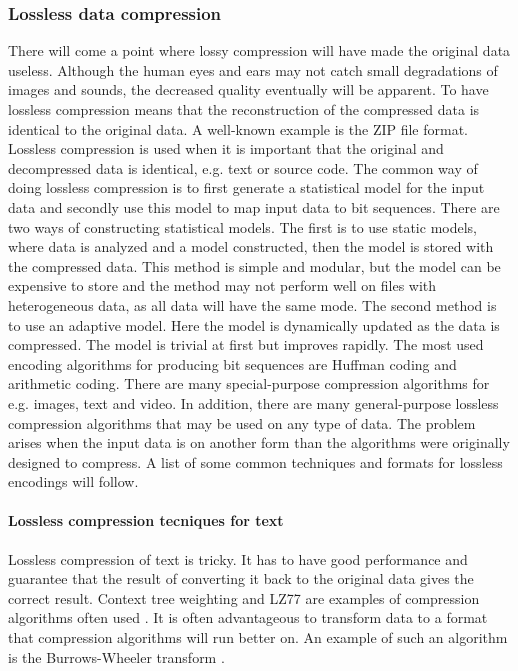 \subsubsection{Lossless data compression}
There will come a point where lossy compression will have made the original data useless. Although the human eyes and ears may not catch small degradations of images and sounds, the decreased quality eventually will be apparent.
\newline
\newline
To have lossless compression means that the reconstruction of the compressed data is identical to the original data. A well-known example is the ZIP file format. Lossless compression is used when it is important that the original and decompressed data is identical, e.g. text or source code. The common way of doing lossless compression is to first generate a statistical model for the input data and secondly use this model to map input data to bit sequences. There are two ways of constructing statistical models. The first is to use static models, where data is analyzed and a model constructed, then the model is stored with the compressed data. This method is simple and modular, but the model can be expensive to store and the method may not perform well on files with heterogeneous data, as all data will have the same mode. The second method is to use an adaptive model. Here the model is dynamically updated as the data is compressed. The model is trivial at first but improves rapidly.
\newline
\newline
The most used encoding algorithms for producing bit sequences are Huffman coding and arithmetic coding. There are many special-purpose compression algorithms for e.g. images, text and video. In addition, there are many general-purpose lossless compression algorithms that may be used on any type of data. The problem arises when the input data is on another form than the algorithms were originally designed to compress.
A list of some common techniques and formats for lossless encodings will follow. \cite{bib:losslessCompression}


\paragraph{Lossless compression tecniques for text} \hfill \newline

Lossless compression of text is tricky. It has to have good performance and guarantee that the result of converting it back to the original data gives the correct result. Context tree weighting and LZ77 are examples of compression algorithms often used  \cite{bib:contextTreeWeightingResearch}. It is often advantageous to transform data to a format that compression algorithms will run better on. An example of such an algorithm is the Burrows-Wheeler transform \cite{bib:burrowsWheelerTransform}. 

